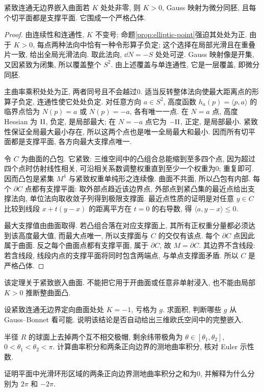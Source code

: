 \begin{theorem}[二维 Hadamard 凸性]\label{thm:hadamard}
紧致连通无边界嵌入曲面若 $K$ 处处非零, 则 $K>0$, Gauss 映射为微分同胚, 且每个切平面都是支撑平面. 它围成一个严格凸体.
\end{theorem}
\begin{proof}
由连续性和连通性, $K$ 不变号; 命题\ref{prop:elliptic-point}强迫其处处为正. 由于 $K>0$, 每点两种法向中恰有一种令形算子负定; 这个选择在局部光滑且在重叠片一致, 给出全局光滑法向. 取此法向, $\dd N=-S$ 处处可逆. Gauss 映射像是开集, 又因紧致为闭集, 所以覆盖整个 $S^2$. 由上述覆盖与单连通性, 它是一层覆盖, 即微分同胚.

主曲率乘积处处为正, 两者同号且不会越过0. 适当反转整体法向使最大距离点的形算子负定, 连通性使它处处负定. 对任意方向 $a\in S^2$, 高度函数 $h_a(p)=\langle p,a\rangle$ 的临界点恰为 $N(p)=a$ 或 $N(p)=-a$, 各有唯一一点. 在 $N=a$ 点, 高度 Hessian 为 $\mathrm{II}$, 负定, 是局部最大; 在 $N=-a$ 点它为 $-\mathrm{II}$, 正定, 是局部最小. 紧致性保证全局最大最小存在, 所以这两个点也是唯一全局最大和最小. 因而所有切平面都是支撑平面, 各方向最大支撑点唯一.

令 $C$ 为曲面的凸包. 它紧致: 三维空间中的凸组合总能缩到至多四个点, 因为超过四个点时仿射线性相关, 可沿相关系数调整权重直到至少一个权重为0; 重复即可. 因而凸包是紧集 $M^4$ 与紧致权重单纯形之连续像. 曲面不共面, 所以凸包有内部. 每个 $\partial C$ 点都有支撑平面: 取外部点趋近该边界点, 外部点到紧凸集的最近点给出支撑法向, 单位法向取收敛子列得到极限支撑面. 最近点性质的证明是对任意 $y\in C$ 比较到线段 $x+t(y-x)$ 的距离平方在 $t=0$ 的右导数, 得 $\langle a,y-x\rangle\le0$.

最大支撑值由曲面取得. 若凸组合落在对应支撑面上, 其所有正权重分量都必须达到该高度最大值, 而最大点唯一, 所以支撑面与 $C$ 的交仅有该点. 每个 $\partial C$ 点因此属于曲面. 反之每个曲面点都有支撑平面, 属于 $\partial C$, 故 $M=\partial C$. 其边界不含线段: 若含线段, 线段内点的支撑平面将同时包含两端点, 与单点支撑面矛盾. 所以 $C$ 是严格凸体.
\end{proof}
该定理关于紧致嵌入曲面. 不能把它用于开曲面或任意非单射浸入, 也不能由局部 $K>0$ 推断整曲面凸.
\begin{exercise}\label{ex:11a}
设紧致连通无边界定向曲面处处 $K=-1$, 亏格为 $g$. 求面积, 判断哪些 $g$ 从 Gauss--Bonnet 看可能. 说明该结论是否自动给出三维欧氏空间中的完整嵌入.
\end{exercise}
\begin{exercise}\label{ex:11b}
半径 $R$ 的球面上去掉两个互不相交极帽, 剩余纬带极角为 $\theta\in[\theta_1,\theta_2]$, $0<\theta_1<\theta_2<\pi$. 计算曲率积分和两条正向边界的测地曲率积分, 核对 Euler 示性数.
\end{exercise}
\begin{exercise}\label{ex:11c}
证明平面中光滑环形区域的两条正向边界测地曲率积分之和为0, 并解释为什么分别为 $2\pi$ 和 $-2\pi$.
\end{exercise}
